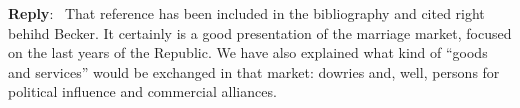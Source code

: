 \documentclass[11pt]{article}
\newenvironment{reply}
   {\medskip \noindent \begin{sf}\textbf{Reply}:\  }
   {\medskip \end{sf}}
\begin{document}
 \begin{reply}
That reference has been included in the bibliography and cited right behihd
Becker. It certainly is a good presentation of the marriage market, focused on
the last years of the Republic. We have also explained what kind of ``goods and
services'' would be exchanged in that market: dowries and, well, persons for
political influence and commercial alliances.
 \end{reply}



\end{document}
